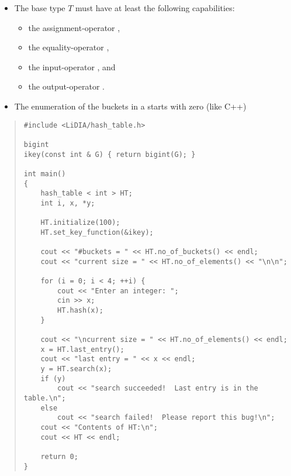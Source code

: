 



\NOTES

\begin{itemize}
\item The base type $T$ must have at least the following capabilities:
\begin{itemize}
\item the assignment-operator \code{=},
\item the equality-operator \code{==},
\item the input-operator \code{>>}, and
\item the output-operator \code{<<}.
\end{itemize}
\item The enumeration of the buckets in a  starts with zero (like C++)
\end{itemize}



\EXAMPLES

\begin{quote}
\begin{verbatim}
#include <LiDIA/hash_table.h>

bigint
ikey(const int & G) { return bigint(G); }

int main()
{
    hash_table < int > HT;
    int i, x, *y;

    HT.initialize(100);
    HT.set_key_function(&ikey);

    cout << "#buckets = " << HT.no_of_buckets() << endl;
    cout << "current size = " << HT.no_of_elements() << "\n\n";

    for (i = 0; i < 4; ++i) {
        cout << "Enter an integer: ";
        cin >> x;
        HT.hash(x);
    }

    cout << "\ncurrent size = " << HT.no_of_elements() << endl;
    x = HT.last_entry();
    cout << "last entry = " << x << endl;
    y = HT.search(x);
    if (y)
        cout << "search succeeded!  Last entry is in the table.\n";
    else
        cout << "search failed!  Please report this bug!\n";
    cout << "Contents of HT:\n";
    cout << HT << endl;

    return 0;
}
\end{verbatim}
\end{quote}

